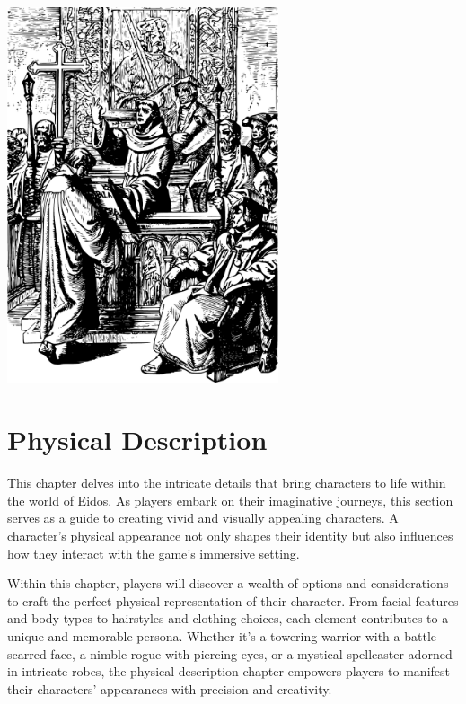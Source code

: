 \documentclass[12pt]{book}
\begin{document}
\begin{center}
    \includegraphics[width=0.6\textwidth]{./images/religion06.pdf}
\end{center}


\chapter{Physical Description}

This chapter delves into the intricate details that bring characters to life within the world of Eidos. As players embark on their imaginative journeys, this section serves as a guide to creating vivid and visually appealing characters. A character's physical appearance not only shapes their identity but also influences how they interact with the game's immersive setting.

Within this chapter, players will discover a wealth of options and considerations to craft the perfect physical representation of their character. From facial features and body types to hairstyles and clothing choices, each element contributes to a unique and memorable persona. Whether it's a towering warrior with a battle-scarred face, a nimble rogue with piercing eyes, or a mystical spellcaster adorned in intricate robes, the physical description chapter empowers players to manifest their characters' appearances with precision and creativity.
\end{document}
